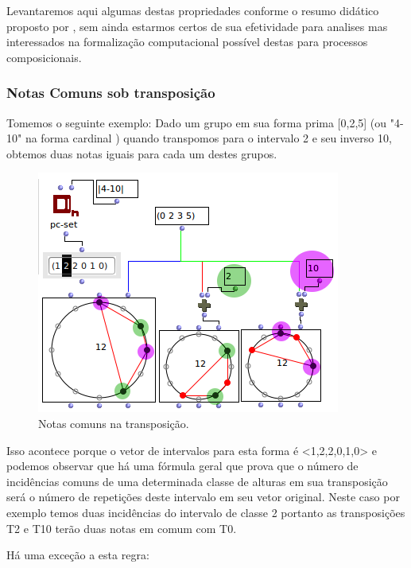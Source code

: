 \documentclass[
	12pt,				%
	openright,			%
	twoside,			%
	a4paper,			%
	english,			%
	french,				%
	spanish,			%
	brazil				%
	]{abntex2}
\begin{document}
Levantaremos aqui algumas destas propriedades conforme o resumo didático proposto por \cite{straus2004}, sem ainda estarmos certos de sua efetividade para analises mas interessados na formalização computacional possível destas para processos composicionais.


\subsubsection{Notas Comuns sob transposição}

Tomemos o seguinte exemplo: Dado um grupo em sua forma prima [0,2,5] (ou "4-10" na forma cardinal ) quando transpomos para o intervalo 2 e seu inverso 10, obtemos duas notas iguais para cada um destes grupos.

\begin{figure}[!h]
	\caption{\label{fig_grafico}Notas comuns na transposição. }
	\begin{center}
	    \includegraphics[scale=0.7]{OM_settheory/notas_comuns_2e10.png}
	\end{center}
\end{figure}



Isso acontece porque o vetor de intervalos para esta forma é <1,2,2,0,1,0> e podemos observar que há uma fórmula geral que prova que o número de incidências comuns de uma determinada classe de alturas em sua transposição será o número de repetições deste intervalo em seu vetor original. Neste caso por exemplo temos duas incidências do intervalo de classe 2 portanto as transposições T2 e T10 terão duas notas em comum com T0.

Há uma exceção a esta regra:
 
\end{document}
